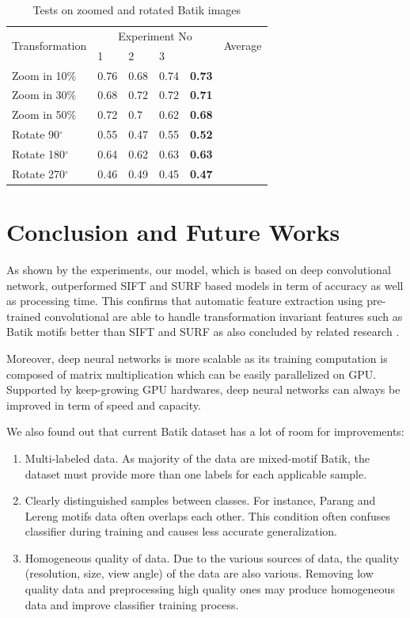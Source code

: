 \documentclass[conference, compsoc]{IEEEtran}
\begin{document}
\begin{table}
	\begin{center}
		\caption{Tests on zoomed and rotated Batik images}
		\label{tab_experiment_results_2}	
		\begin{tabular}{llllll}
		    \toprule
			\multirow{2}{*}[-3pt]{Transformation}  & \multicolumn{4}{c}{Experiment No} & \multirow{2}{*}[-3pt]{Average} \\ 
		    \cmidrule{2-4} 
		  & 1 & 2 & 3 & \\ 
		     \midrule
Zoom in 10\% & 0.76 & 0.68 & 0.74 & \textbf{0.73} \\
Zoom in 30\% & 0.68 & 0.72 & 0.72 & \textbf{0.71} \\
Zoom in 50\% & 0.72 & 0.7 & 0.62 & \textbf{0.68} \\
Rotate 90$^{\circ}$ & 0.55 & 0.47 & 0.55 & \textbf{0.52} \\
Rotate 180$^{\circ}$ & 0.64 & 0.62 & 0.63 & \textbf{0.63} \\
Rotate 270$^{\circ}$ & 0.46 & 0.49 & 0.45 & \textbf{0.47} \\
		    \bottomrule
		\end{tabular}
	\end{center}
\end{table} 


\section{Conclusion and Future Works}

As shown by the experiments, our model, which is based on deep convolutional network, outperformed SIFT and SURF based models in term of accuracy as well as processing time. This confirms that automatic feature extraction using pre-trained convolutional are able to handle transformation invariant features such as Batik motifs better than SIFT and SURF as also concluded by related research \cite{fischer2014descriptor}.

Moreover, deep neural networks is more scalable as its training computation is composed of matrix multiplication which can be easily parallelized on GPU. Supported by keep-growing GPU hardwares, deep neural networks can always be improved in term of speed and capacity.

We also found out that current Batik dataset has a lot of room for improvements:

\begin{enumerate}
	\item Multi-labeled data. As majority of the data are mixed-motif Batik, the dataset must provide more than one labels for each applicable sample.
	\item Clearly distinguished samples between classes. For instance, Parang and Lereng motifs data often overlaps each other. This condition often confuses classifier during training and causes less accurate generalization.
	\item Homogeneous quality of data. Due to the various sources of data, the quality (resolution, size, view angle) of the data are also various. Removing low quality data and preprocessing high quality ones may produce homogeneous data and improve classifier training process.
\end{enumerate}
\end{document}
